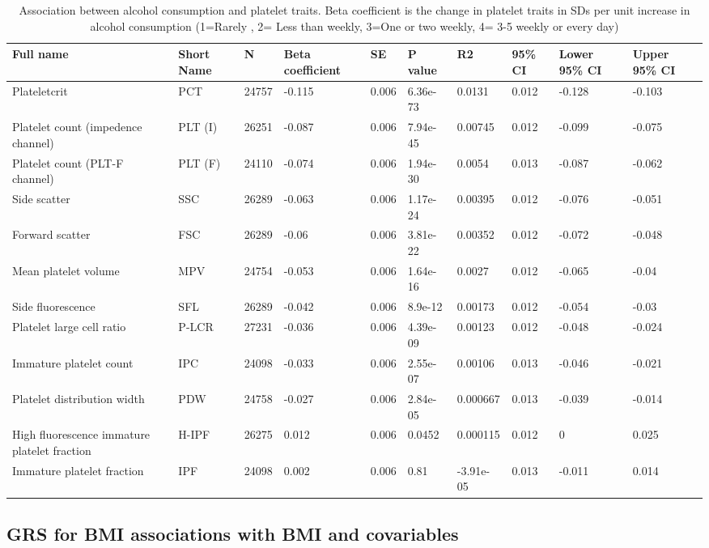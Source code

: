 \documentclass[11pt,twoside]{bristolthesis}
\begin{document}
\begin{landscape}\begin{table}

\caption[Association between alcohol consumption and platelet traits]{\label{tab:alcohol-platelets}Association between alcohol consumption and platelet traits. Beta coefficient is the change in platelet traits in SDs per unit increase in alcohol consumption (1=Rarely , 2= Less than weekly, 3=One or two weekly, 4= 3-5 weekly or every day) }
\centering
\begin{tabu} to 
\toprule
Full name & Short Name & N & Βeta coefficient & SE & P value & R2 & 95\% CI & Lower 95\% CI & Upper 95\% CI\\
\midrule
Plateletcrit & PCT & 24757 & -0.115 & 0.006 & 6.36e-73 & 0.0131 & 0.012 & -0.128 & -0.103\\
Platelet count (impedence channel) & PLT (I) & 26251 & -0.087 & 0.006 & 7.94e-45 & 0.00745 & 0.012 & -0.099 & -0.075\\
Platelet count (PLT-F channel) & PLT (F) & 24110 & -0.074 & 0.006 & 1.94e-30 & 0.0054 & 0.013 & -0.087 & -0.062\\
Side scatter & SSC & 26289 & -0.063 & 0.006 & 1.17e-24 & 0.00395 & 0.012 & -0.076 & -0.051\\
Forward scatter & FSC & 26289 & -0.06 & 0.006 & 3.81e-22 & 0.00352 & 0.012 & -0.072 & -0.048\\
\addlinespace
Mean platelet volume & MPV & 24754 & -0.053 & 0.006 & 1.64e-16 & 0.0027 & 0.012 & -0.065 & -0.04\\
Side fluorescence & SFL & 26289 & -0.042 & 0.006 & 8.9e-12 & 0.00173 & 0.012 & -0.054 & -0.03\\
Platelet large cell ratio & P-LCR & 27231 & -0.036 & 0.006 & 4.39e-09 & 0.00123 & 0.012 & -0.048 & -0.024\\
Immature platelet count & IPC & 24098 & -0.033 & 0.006 & 2.55e-07 & 0.00106 & 0.013 & -0.046 & -0.021\\
Platelet distribution width & PDW & 24758 & -0.027 & 0.006 & 2.84e-05 & 0.000667 & 0.013 & -0.039 & -0.014\\
\addlinespace
High fluorescence immature platelet fraction & H-IPF & 26275 & 0.012 & 0.006 & 0.0452 & 0.000115 & 0.012 & 0 & 0.025\\
Immature platelet fraction & IPF & 24098 & 0.002 & 0.006 & 0.81 & -3.91e-05 & 0.013 & -0.011 & 0.014\\
\bottomrule
\end{tabu}
\end{table}
\end{landscape}
\hypertarget{grs-for-bmi-associations-with-bmi-and-covariables}{%
\subsection{GRS for BMI associations with BMI and covariables}\label{grs-for-bmi-associations-with-bmi-and-covariables}}
\end{document}
